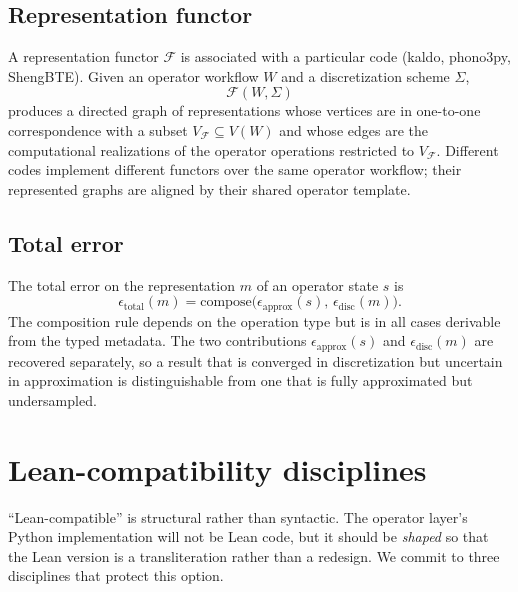 \documentclass[11pt,a4paper]{article}
\begin{document}
\subsection{Representation functor}

A representation functor $\mathcal{F}$ is associated with a particular code (kaldo, phono3py,
ShengBTE). Given an operator workflow $W$ and a discretization scheme $\Sigma$,
\begin{equation}
  \mathcal{F}(W, \Sigma)
\end{equation}
produces a directed graph of representations whose vertices are in one-to-one correspondence
with a subset $V_{\mathcal{F}} \subseteq V(W)$ and whose edges are the computational realizations
of the operator operations restricted to $V_{\mathcal{F}}$. Different codes implement different
functors over the same operator workflow; their represented graphs are aligned by their shared
operator template.

\subsection{Total error}

The total error on the representation $m$ of an operator state $s$ is
\begin{equation}
  \epsilon_{\text{total}}(m)
  = \mathrm{compose}\bigl(\epsilon_{\text{approx}}(s),\, \epsilon_{\text{disc}}(m)\bigr).
\end{equation}
The composition rule depends on the operation type but is in all cases derivable from the
typed metadata. The two contributions $\epsilon_{\text{approx}}(s)$ and
$\epsilon_{\text{disc}}(m)$ are recovered separately, so a result that is converged in
discretization but uncertain in approximation is distinguishable from one that is fully
approximated but undersampled.


\section{Lean-compatibility disciplines}
\label{sec:lean-disciplines}

``Lean-compatible'' is structural rather than syntactic. The operator layer's Python implementation
will not be Lean code, but it should be \emph{shaped} so that the Lean version is a
transliteration rather than a redesign. We commit to three disciplines that protect this option.
\end{document}
